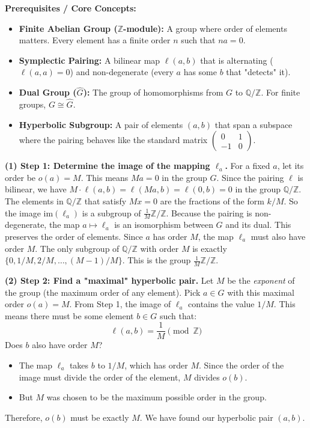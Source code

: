 \begin{solution}
\textbf{Prerequisites / Core Concepts:}
\begin{itemize}
    \item \textbf{Finite Abelian Group ($\mathbb{Z}$-module):} A group where order of elements matters. Every element has a finite order $n$ such that $na = 0$.
    \item \textbf{Symplectic Pairing:} A bilinear map $\ell(a, b)$ that is alternating ($\ell(a, a) = 0$) and non-degenerate (every $a$ has some $b$ that "detects" it).
    \item \textbf{Dual Group ($\widehat{G}$):} The group of homomorphisms from $G$ to $\mathbb{Q}/\mathbb{Z}$. For finite groups, $G \cong \widehat{G}$.
    \item \textbf{Hyperbolic Subgroup:} A pair of elements $(a, b)$ that span a subspace where the pairing behaves like the standard matrix $\begin{pmatrix} 0 & 1 \\ -1 & 0 \end{pmatrix}$.
\end{itemize}

\textbf{(1) Step 1: Determine the image of the mapping $\ell_a$.}
For a fixed $a$, let its order be $o(a) = M$. This means $Ma = 0$ in the group $G$.
Since the pairing $\ell$ is bilinear, we have $M \cdot \ell(a, b) = \ell(Ma, b) = \ell(0, b) = 0$ in the group $\mathbb{Q}/\mathbb{Z}$.
The elements in $\mathbb{Q}/\mathbb{Z}$ that satisfy $Mx = 0$ are the fractions of the form $k/M$. So the image $\text{im}(\ell_a)$ is a subgroup of $\frac{1}{M}\mathbb{Z}/\mathbb{Z}$.
Because the pairing is non-degenerate, the map $a \mapsto \ell_a$ is an isomorphism between $G$ and its dual. This preserves the order of elements. Since $a$ has order $M$, the map $\ell_a$ must also have order $M$. The only subgroup of $\mathbb{Q}/\mathbb{Z}$ with order $M$ is exactly $\{ 0, 1/M, 2/M, \dots, (M-1)/M \}$. This is the group $\frac{1}{M}\mathbb{Z}/\mathbb{Z}$.

\textbf{(2) Step 2: Find a "maximal" hyperbolic pair.}
Let $M$ be the \textit{exponent} of the group (the maximum order of any element). Pick $a \in G$ with this maximal order $o(a) = M$.
From Step 1, the image of $\ell_a$ contains the value $1/M$. This means there must be some element $b \in G$ such that:
\[ \ell(a, b) = \frac{1}{M} \pmod{\mathbb{Z}} \]
Does $b$ also have order $M$?
\begin{itemize}
    \item The map $\ell_a$ takes $b$ to $1/M$, which has order $M$. Since the order of the image must divide the order of the element, $M$ divides $o(b)$.
    \item But $M$ was chosen to be the maximum possible order in the group.
\end{itemize}
Therefore, $o(b)$ must be exactly $M$. We have found our hyperbolic pair $(a, b)$.


\end{solution}
